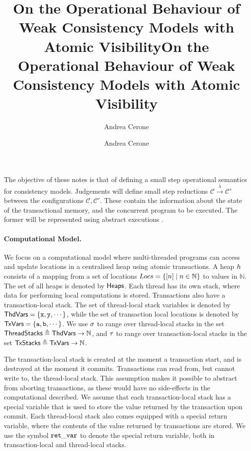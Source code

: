 \documentclass[a4paper,UKenglish]{article}%
\title{On the Operational Behaviour of Weak Consistency Models with Atomic Visibility}
\title{On the Operational Behaviour of Weak Consistency Models with Atomic Visibility}
\author[1]{Andrea Cerone}
\affil[1]{Imperial College London, UK}
\author[1]{Andrea Cerone}
\affil[1]{Imperial College London, UK, \texttt{a.cerone@imperial.ac.uk}}
\theoremstyle{plain}
\begin{document}
\maketitle
The objective of these notes is that of defining a small step operational semantics for 
consistency models. Judgements will define small step reductions $\mathcal{C} \xrightarrow{\lambda} \mathcal{C'}$ 
between the configurations $\mathcal{C}, \mathcal{C'}$. These contain the information about the state of the 
transactional memory, and the concurrent program to be executed. The former will be represented using 
abstract executions \cite{framework-concur}.

\paragraph{\textbf{Computational Model.}}
We focus on a computational model where multi-threaded programs can access and update 
locations in a centralised heap using atomic transactions. A heap $h$ consists of a mapping 
from a set of locations $Locs = \{ [n] \mid n \in \mathbb{N}\}$ to values in $\mathbb{N}$. 
The set of all heaps is denoted by $\mathsf{Heaps}$. 
Each thread has its own stack, 
where data for performing local computations is stored. Transactions also 
have a transaction-local stack. 
The set of thread-local stack variables is denoted by $\mathsf{ThdVars} = \{\mathtt{x}, \mathtt{y}, \cdots\}$, 
while the set of transaction local locations is denoted by $\mathsf{TxVars} = \{\mathtt{a}, \mathtt{b}, \cdots\}$. 
We use $\sigma$ to range over thread-local stacks in the set $\mathsf{ThreadStacks} \triangleq \mathsf{ThdVars} \rightarrow \mathbb{N}$, 
and $\tau$ to range over transaction-local stacks in the set $\mathsf{TxStacks} \triangleq \mathsf{TxVars} \rightarrow \mathbb{N}$.

The transaction-local stack is created at the moment a transaction start, 
and is destroyed at the moment it commits. 
Transactions can read from, but cannot 
write to, the thread-local stack. This assumption makes it possible to abstract from 
aborting transactions, as these would have no side-effects in the computational described. 
We assume that each transaction-local 
stack has a special variable that is used to store the value returned by the transaction 
upon commit. Each thread-local stack also comes equipped with a special return variable, 
where the contents of the value returned by transactions are stored. We use the symbol 
$\mathtt{ret}\_\mathtt{var}$ to denote the special return variable, both in transaction-local and thread-local 
stacks.
\end{document}

